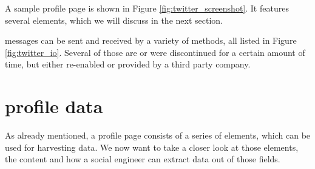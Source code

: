 A sample \Twitter{} profile page is shown in Figure
\ref{fig:twitter_screenshot}. It features several elements, which we will
discuss in the next section. 

\Twitter{} messages can be sent and received by a variety of methods, all
listed in Figure \ref{fig:twitter_io}. Several of those are or were
discontinued for a certain amount of time, but either re-enabled or provided by
a third party company.

\section{\Twitter{} profile data}

As already mentioned, a \Twitter{} profile page consists of a series of
elements, which can be used for harvesting data. We now want to take a closer
look at those elements, the content and how a social engineer can extract data
out of those fields.

